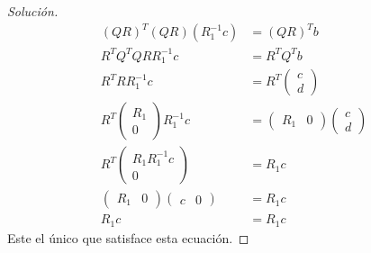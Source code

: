 \documentclass[12pt]{book}
\newenvironment{solucion}
  {\renewcommand\qedsymbol{$\square$}\begin{proof}[Solución]}
  {\end{proof}}
\begin{document}
\begin{solucion}
\begin{align*}
    (QR)^T(QR)\left(R_1^{-1}c\right)&=(QR)^Tb\\
    R^TQ^TQRR_1^{-1}c&=R^TQ^Tb\\
    R^TRR_1^{-1}c&=R^T\begin{pmatrix}
    c\\
    d
    \end{pmatrix}\\
    R^T\begin{pmatrix}
    R_1\\
    0
    \end{pmatrix}R_1^{-1}c&=\begin{pmatrix}
    R_1 & 0
    \end{pmatrix}\begin{pmatrix}
    c\\
    d
    \end{pmatrix}\\
    R^T\begin{pmatrix}
    R_1R_1^{-1}c\\
    0
    \end{pmatrix}&=R_1c\\
    \begin{pmatrix}
    R_1 & 0
    \end{pmatrix}\begin{pmatrix}
    c & 0
    \end{pmatrix}&=R_1c\\
    R_1c&=R_1c
\end{align*}
Este el único que satisface esta ecuación.
\end{solucion}
\end{document}
